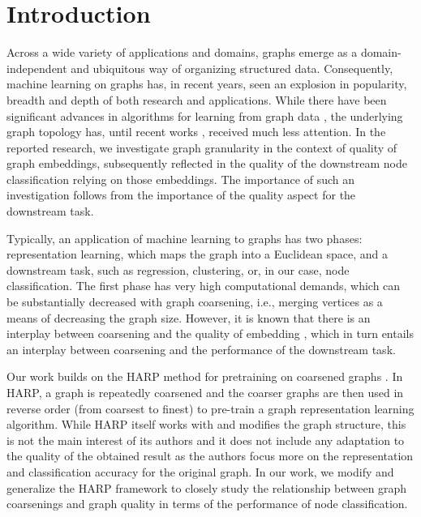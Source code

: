 \section{Introduction}
Across a wide variety of applications and domains, graphs emerge as a domain-independent and ubiquitous way of organizing structured data. Consequently, machine learning on graphs has, in recent years, seen an explosion in popularity, breadth and depth of both research and applications. While there have been significant advances in algorithms for learning from graph data \cite{defferrard_convolutional_2016,kipf_semi-supervised_2017}, the underlying graph topology has, until recent works \cite{topping_understanding_2021,velickovic_geometric_2021}, received much less attention. In the reported research, we investigate graph granularity in the context of quality of graph embeddings, subsequently reflected in the quality of the downstream node classification relying on those embeddings. The importance of such an investigation follows from the importance of the quality aspect for the downstream task.

Typically, an application of machine learning to graphs has two phases: representation learning, which maps the graph into a Euclidean space, and a downstream task, such as regression, clustering, or, in our case, node classification. The first phase has very high computational demands, which can be substantially decreased with graph coarsening, i.e., merging vertices as a means of decreasing the graph size. However, it is known that there is an interplay between coarsening and the quality of embedding \cite{akyildiz_understanding_2020,makarov_survey_2021}, which in turn entails an interplay between coarsening and the performance of the downstream task.

Our work builds on the HARP method for pretraining on coarsened graphs \cite{chen_harp_2018}. In HARP, a graph is repeatedly coarsened and the coarser graphs are then used in reverse order (from coarsest to finest) to pre-train a graph representation learning algorithm. While HARP itself works with and modifies the graph structure, this is not the main interest of its authors and it does not include any adaptation to the quality of the obtained result as the authors focus more on the representation and classification accuracy for the original graph. In our work, we modify and generalize the HARP framework to closely study the relationship between graph coarsenings and graph quality in terms of the performance of node classification.

